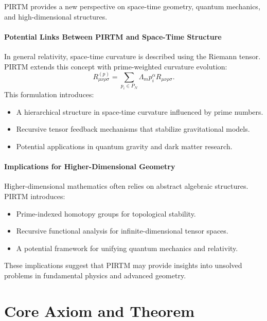 \documentclass{article}
\theoremstyle{plain}
\begin{document}
PIRTM provides a new perspective on space-time geometry, quantum mechanics, and high-dimensional structures.

\paragraph{Potential Links Between PIRTM and Space-Time Structure}
In general relativity, space-time curvature is described using the Riemann tensor. PIRTM extends this concept with prime-weighted curvature evolution:
\begin{equation}
    R_{\mu\nu\rho\sigma}^{(p)} = \sum_{p_i \in P_N} \Lambda_m p_i^\alpha R_{\mu\nu\rho\sigma}.
\end{equation}
This formulation introduces:
\begin{itemize}
    \item A hierarchical structure in space-time curvature influenced by prime numbers.
    \item Recursive tensor feedback mechanisms that stabilize gravitational models.
    \item Potential applications in quantum gravity and dark matter research.
\end{itemize}

\paragraph{Implications for Higher-Dimensional Geometry}
Higher-dimensional mathematics often relies on abstract algebraic structures. PIRTM introduces:
\begin{itemize}
    \item Prime-indexed homotopy groups for topological stability.
    \item Recursive functional analysis for infinite-dimensional tensor spaces.
    \item A potential framework for unifying quantum mechanics and relativity.
\end{itemize}
These implications suggest that PIRTM may provide insights into unsolved problems in fundamental physics and advanced geometry.


\section{Core Axiom and Theorem}
\end{document}
